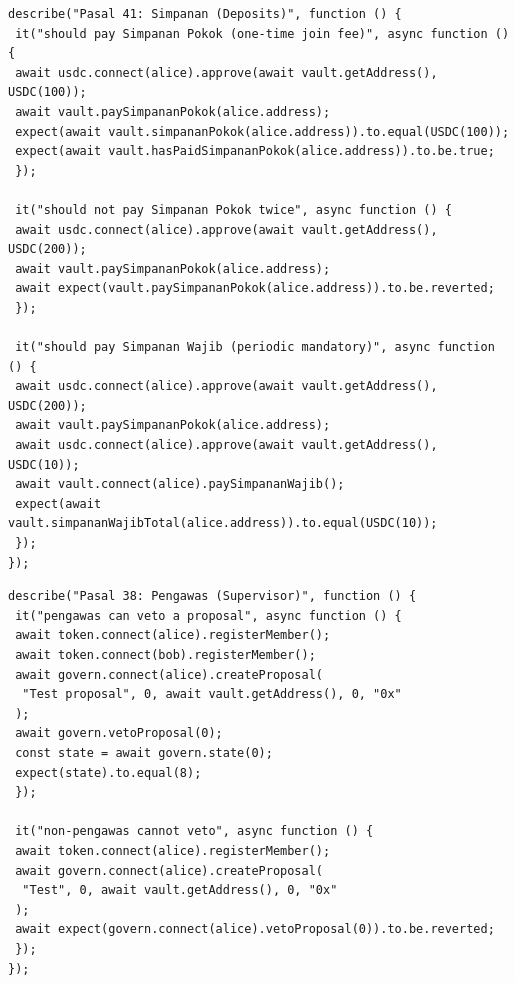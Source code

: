 \begin{lstlisting}[language={}, caption={Skrip Pengujian: Simpanan (Pasal 41(2) UU 25/1992)}, label={lst:test-simpanan}, basicstyle=\ttfamily\scriptsize, breaklines=true]
describe("Pasal 41: Simpanan (Deposits)", function () {
 it("should pay Simpanan Pokok (one-time join fee)", async function () {
 await usdc.connect(alice).approve(await vault.getAddress(), USDC(100));
 await vault.paySimpananPokok(alice.address);
 expect(await vault.simpananPokok(alice.address)).to.equal(USDC(100));
 expect(await vault.hasPaidSimpananPokok(alice.address)).to.be.true;
 });

 it("should not pay Simpanan Pokok twice", async function () {
 await usdc.connect(alice).approve(await vault.getAddress(), USDC(200));
 await vault.paySimpananPokok(alice.address);
 await expect(vault.paySimpananPokok(alice.address)).to.be.reverted;
 });

 it("should pay Simpanan Wajib (periodic mandatory)", async function () {
 await usdc.connect(alice).approve(await vault.getAddress(), USDC(200));
 await vault.paySimpananPokok(alice.address);
 await usdc.connect(alice).approve(await vault.getAddress(), USDC(10));
 await vault.connect(alice).paySimpananWajib();
 expect(await vault.simpananWajibTotal(alice.address)).to.equal(USDC(10));
 });
});
\end{lstlisting}

\begin{lstlisting}[language={}, caption={Skrip Pengujian: Pengawas (Pasal 38 UU 25/1992)}, label={lst:test-pengawas}, basicstyle=\ttfamily\scriptsize, breaklines=true]
describe("Pasal 38: Pengawas (Supervisor)", function () {
 it("pengawas can veto a proposal", async function () {
 await token.connect(alice).registerMember();
 await token.connect(bob).registerMember();
 await govern.connect(alice).createProposal(
  "Test proposal", 0, await vault.getAddress(), 0, "0x"
 );
 await govern.vetoProposal(0);
 const state = await govern.state(0);
 expect(state).to.equal(8);
 });

 it("non-pengawas cannot veto", async function () {
 await token.connect(alice).registerMember();
 await govern.connect(alice).createProposal(
  "Test", 0, await vault.getAddress(), 0, "0x"
 );
 await expect(govern.connect(alice).vetoProposal(0)).to.be.reverted;
 });
});
\end{lstlisting}

